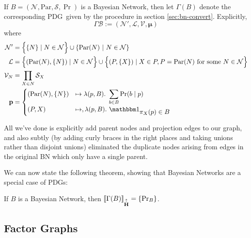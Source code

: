 \documentclass{article}
\newcommand{\MN}{PDG}%
\newcommand{\MNs}{PDGs}
\newcommand\MaxEnt{{\overset{\uparrow}{\mathbf H}}}
\newcommand\bmu{\boldsymbol{\mu}}
\begin{document}
	
		\begin{defn}
			If $B = (\mathcal N, \mathrm{Par}, \mathcal S, \Pr)$ is a Bayesian Network, then let $\Gamma (B)$ denote the corresponding \MN\ given by the procedure in section \ref{sec:bn-convert}. Explicitly, 
			\[ \Gamma\mathcal B :=  (\mathcal N', \mathcal L, \mathcal V, \bmu) \]
			where %
			\begin{align*}
				\mathcal N' &=  \left\{ \Big.\{N\} \mid N \in \mathcal N\right\} \cup \left\{ \mathrm{Par}(N) ~\middle|~ N \in \cal N \right\} \\%
				\mathcal L &= \left\{ \vphantom{\Big|}(\mathrm{Par}(N), \{N\}) \mid N \in \mathcal N \right\} \cup 
					\left\{\vphantom{\Big|} (P, \{X\}) \mid X \in P, P = \mathrm{Par}(N) \text{ for some }N \in \mathcal N \right\} \\
				\mathcal V_N &= \prod_{X \in N} \mathcal S_X \\
				\mathbf p &= \begin{cases}
					 	(\mathrm{Par}(N), \{N\}) &\mapsto \lambda(p, B).~ \displaystyle\sum_{b \in  B} \Pr(b \mid p) \\
					 	(P, X) &\mapsto, \lambda (p, B).~ \displaystyle \mathbbm 1_{\displaystyle\pi_X(p) \in B}
					\end{cases}
			\end{align*}
		\end{defn}
		All we've done is explicitly add parent nodes and projection edges to our graph, and also subtly (by adding curly braces in the right places and taking unions rather than disjoint unions) eliminated the duplicate nodes arising from edges in the original BN which only have a single parent.
		
		We can now state the following theorem, showing that Bayesian Networks are a special case of \MNs: 
		\begin{theorem}
			If $B$ is a Bayesian Network, then $\bbr{\Gamma(B)}_\MaxEnt =\{\Pr_B\}$.
		\end{theorem}
	
	\subsection{Factor Graphs} \label{sec:factor-graphs}
	
\end{document}
